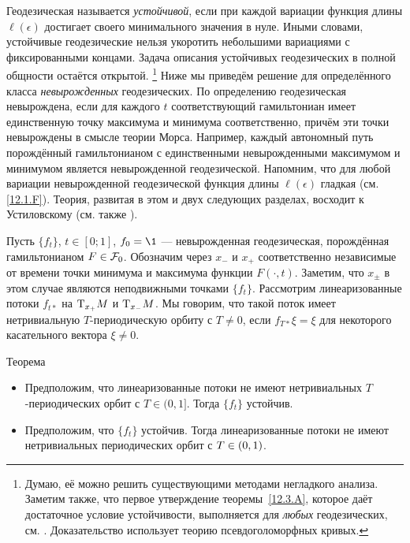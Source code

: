 Геодезическая называется \emph{устойчивой}, если при каждой вариации функция
длины $\ell(\epsilon)$ достигает своего минимального значения в нуле. 
Иными словами, устойчивые геодезические нельзя укоротить небольшими
вариациями с фиксированными концами. 
Задача описания устойчивых геодезических в полной общности остаётся открытой.%
\footnote{Думаю, её можно решить существующими методами негладкого анализа.
Заметим также, что первое утверждение теоремы~\ref{12.3.A},
которое даёт достаточное условие устойчивости, выполняется для
{}\emph{любых} геодезических, см. \cite{LM3}.  
Доказательство использует теорию псевдоголоморфных кривых.}
Ниже мы приведём решение для определённого класса
\emph{невырожденных}
геодезических. 
По определению геодезическая невырождена, если для каждого $t$
соответствующий гамильтониан имеет единственную точку максимума и
минимума соответственно, причём эти точки невырождены в смысле теории
Морса. 
Например, каждый автономный путь порождённый гамильтонианом с единственными невырожденными максимумом и минимумом является невырожденной геодезической. 
Напомним, что для любой вариации невырожденной геодезической функция длины $\ell(\epsilon)$ гладкая (см. \ref{12.1.F}). 
Теория, развитая в этом и двух следующих разделах, восходит к
Устиловскому \cite{U} (см. также
\cite{LM2}). 

Пусть $\{f_t\}$, $t \in [0; 1]$, $f_0 = \1$ — невырожденная
геодезическая, порождённая гамильтонианом $F\in \mathcal{F}_0$. 
Обозначим через $x_-$ и $x_+$ соответственно независимые от времени
точки минимума и максимума функции $F(\cdot, t)$. 
Заметим, что $x_\pm$ в этом случае являются неподвижными точками $\{f_t\}$.
Рассмотрим линеаризованные потоки $f_{t*}$ на $\mathrm{T}_{x_+}M$ и $\mathrm{T}_{x_-}M$.
Мы говорим, что такой поток имеет нетривиальную $T$-периодическую
орбиту с $T\ne0$, если $f_{T*}\xi=\xi$ для некоторого касательного
вектора $\xi\ne0$. 

\begin{thm}[(\cite{U})]{Теорема}\label{12.3.A}

\begin{itemize}
\item Предположим, что линеаризованные потоки не имеют нетривиальных $T$-периодических орбит с $T\in(0,1]$.
Тогда $\{f_t\}$ устойчив.
\item Предположим, что $\{f_t\}$ устойчив.
Тогда линеаризованные потоки не имеют нетривиальных периодических орбит с $T\z\in(0,1)$.
\end{itemize}
\end{thm}

